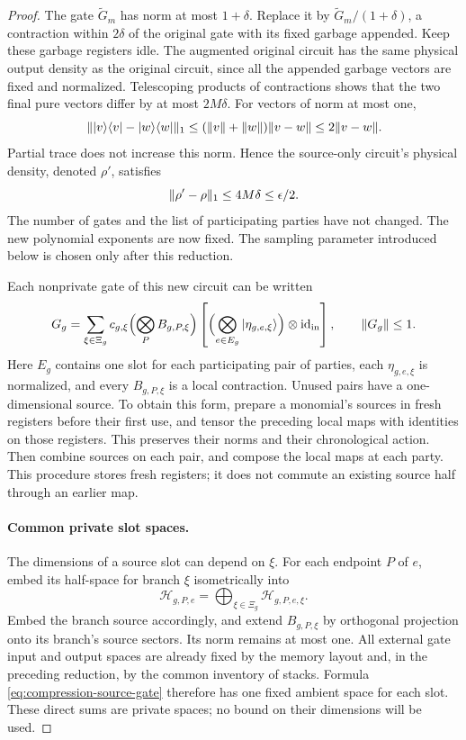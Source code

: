 \begin{proof}
The gate $\widetilde G_m$ has norm at most $1+\delta$.  Replace it by
$\widetilde G_m/(1+\delta)$, a contraction within $2\delta$ of the
original gate with its fixed garbage appended.  Keep these garbage
registers idle.  The augmented original circuit has the same physical
output density as the original circuit, since all the appended garbage
vectors are fixed and normalized.  Telescoping products of contractions
shows that the two final pure vectors differ by at most $2M\delta$.
For vectors of norm at most one,
\[
 \lVert |v\rangle\langle v|-|w\rangle\langle w|\rVert_1
       \le(\lVert v\rVert+\lVert w\rVert)\lVert v-w\rVert
       \le2\lVert v-w\rVert.
\]
Partial trace does not increase this norm.  Hence the source-only
circuit's physical density, denoted $\rho'$, satisfies
\begin{equation}
 \lVert \rho'-\rho\rVert_1\le4M\delta\le\epsilon/2.
 \label{eq:compression-effect-circuit-error}
\end{equation}
The number of gates and the list of participating parties have not
changed.  The new polynomial exponents are now fixed.  The sampling
parameter introduced below is chosen only after this reduction.

Each nonprivate gate of this new circuit can be written
\begin{equation}
 G_g=\sum_{\xi\in\Xi_g}c_{g,\xi}
       \Bigl(\bigotimes_{P}B_{g,P,\xi}\Bigr)
       \left[\Bigl(\bigotimes_{e\in E_g}
                         |\eta_{g,e,\xi}\rangle\Bigr)
                    \otimes\operatorname{id}_{\mathrm{in}}\right],
 \qquad \lVert G_g\rVert\le1.
 \label{eq:compression-source-gate}
\end{equation}
Here $E_g$ contains one slot for each participating pair of parties,
each $\eta_{g,e,\xi}$ is normalized, and every $B_{g,P,\xi}$ is a local
contraction.  Unused pairs have a one-dimensional source.  To obtain
this form, prepare a monomial's sources in fresh registers before their
first use, and tensor the preceding local maps with identities on those
registers.  This preserves their norms and their chronological action.
Then combine sources on each pair, and compose the local maps at each
party.  This procedure stores fresh registers; it does not commute an
existing source half through an earlier map.

\paragraph{Common private slot spaces.}
The dimensions of a source slot can depend on $\xi$.  For each endpoint
$P$ of $e$, embed its half-space for branch $\xi$ isometrically into
\[
 \mathcal H_{g,P,e}
       =\bigoplus_{\xi\in\Xi_g}\mathcal H_{g,P,e,\xi}.
\]
Embed the branch source accordingly, and extend $B_{g,P,\xi}$ by
orthogonal projection onto its branch's source sectors.  Its norm
remains at most one.  All external gate input and output spaces are
already fixed by the memory layout and, in the preceding reduction, by
the common inventory of stacks.  Formula
\eqref{eq:compression-source-gate} therefore has one fixed ambient
space for each slot.  These direct sums are private spaces; no bound on
their dimensions will be used.


\end{proof}
